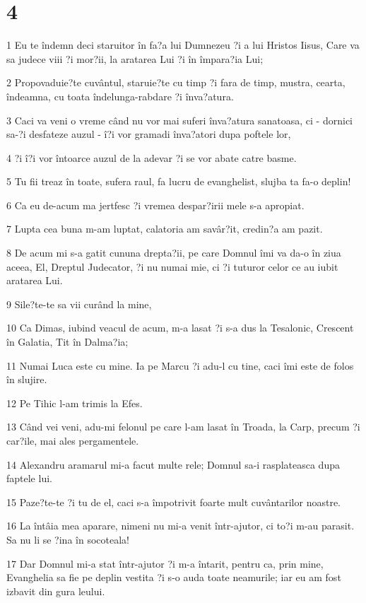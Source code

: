 \chapter{4}

\par 1 Eu te îndemn deci staruitor în fa?a lui Dumnezeu ?i a lui Hristos Iisus, Care va sa judece viii ?i mor?ii, la aratarea Lui ?i în împara?ia Lui;
\par 2 Propovaduie?te cuvântul, staruie?te cu timp ?i fara de timp, mustra, cearta, îndeamna, cu toata îndelunga-rabdare ?i înva?atura.
\par 3 Caci va veni o vreme când nu vor mai suferi înva?atura sanatoasa, ci - dornici sa-?i desfateze auzul - î?i vor gramadi înva?atori dupa poftele lor,
\par 4 ?i î?i vor întoarce auzul de la adevar ?i se vor abate catre basme.
\par 5 Tu fii treaz în toate, sufera raul, fa lucru de evanghelist, slujba ta fa-o deplin!
\par 6 Ca eu de-acum ma jertfesc ?i vremea despar?irii mele s-a apropiat.
\par 7 Lupta cea buna m-am luptat, calatoria am savâr?it, credin?a am pazit.
\par 8 De acum mi s-a gatit cununa drepta?ii, pe care Domnul îmi va da-o în ziua aceea, El, Dreptul Judecator, ?i nu numai mie, ci ?i tuturor celor ce au iubit aratarea Lui.
\par 9 Sile?te-te sa vii curând la mine,
\par 10 Ca Dimas, iubind veacul de acum, m-a lasat ?i s-a dus la Tesalonic, Crescent în Galatia, Tit în Dalma?ia;
\par 11 Numai Luca este cu mine. Ia pe Marcu ?i adu-l cu tine, caci îmi este de folos în slujire.
\par 12 Pe Tihic l-am trimis la Efes.
\par 13 Când vei veni, adu-mi felonul pe care l-am lasat în Troada, la Carp, precum ?i car?ile, mai ales pergamentele.
\par 14 Alexandru aramarul mi-a facut multe rele; Domnul sa-i rasplateasca dupa faptele lui.
\par 15 Paze?te-te ?i tu de el, caci s-a împotrivit foarte mult cuvântarilor noastre.
\par 16 La întâia mea aparare, nimeni nu mi-a venit într-ajutor, ci to?i m-au parasit. Sa nu li se ?ina în socoteala!
\par 17 Dar Domnul mi-a stat într-ajutor ?i m-a întarit, pentru ca, prin mine, Evanghelia sa fie pe deplin vestita ?i s-o auda toate neamurile; iar eu am fost izbavit din gura leului.
